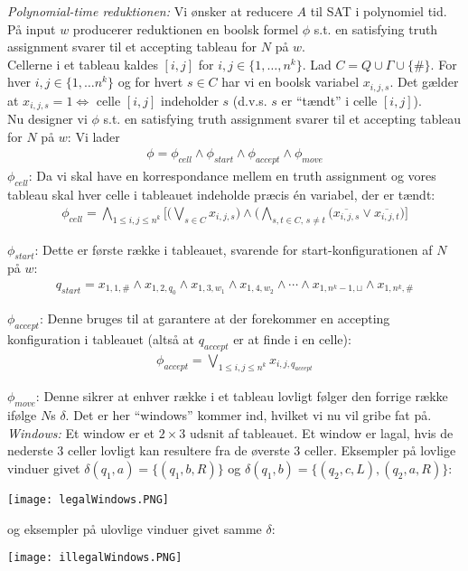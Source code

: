 \textit{Polynomial-time reduktionen:} Vi ønsker at reducere $A$ til SAT i polynomiel tid. På input $w$ producerer reduktionen en boolsk formel $\phi$ s.t. en satisfying truth assignment svarer til et accepting tableau for $N$ på $w$. \\

Cellerne i et tableau kaldes $[i,j]$ for $i,j \in \{1,\ldots,n^k\}$. Lad $C=Q \cup \Gamma \cup \{\#\}$. For hver $i,j \in \{1,\ldots n^k\}$ og for hvert $s \in C$ har vi en boolsk variabel $x_{i,j,s}$. Det gælder at $x_{i,j,s} = 1 \Longleftrightarrow$ celle $[i,j]$ indeholder $s$ (d.v.s. $s$ er ``tændt'' i celle $[i,j]$). \\

Nu designer vi $\phi$ s.t. en satisfying truth assignment svarer til et accepting tableau for $N$ på $w$: Vi lader 
\begin{align*}
	\phi = \phi_{cell} \wedge \phi_{start} \wedge \phi_{accept} \wedge \phi_{move}
\end{align*}  
$\phi_{cell}$: Da vi skal have en korrespondance mellem en truth assignment og vores tableau skal hver celle i tableauet indeholde præcis én variabel, der er tændt: 
\begin{align*}
	\phi_{cell} = \bigwedge_{1 \le i, j \le n^k} \bigg[\bigg(\bigvee_{s \in C} x_{i,j,s} \bigg) \wedge \bigg(\bigwedge_{s,t \in C,\, s\ne t} (\overline{x_{i,j,s}} \vee \overline{x_{i,j,t}} \bigg) \bigg]
\end{align*}

$\phi_{start}$: Dette er første række i tableauet, svarende for start-konfigurationen af $N$ på $w$:
\begin{align*}
	q_{start} = x_{1,1,\#} \wedge x_{1,2,q_0} \wedge x_{1,3,w_1} \wedge x_{1,4,w_2} \wedge \cdots \wedge x_{1,n^k-1,\sqcup} \wedge x_{1,n^k,\#}
\end{align*}

$\phi_{accept}$: Denne bruges til at garantere at der forekommer en accepting konfiguration i tableauet (altså at $q_{accept}$ er at finde i en celle):
\begin{align*}
	\phi_{accept} = \bigvee_{1 \le i, j \le n^k} x_{i,j,q_{accept}} 
\end{align*}

$\phi_{move}$: Denne sikrer at enhver række i et tableau lovligt følger den forrige række ifølge $N$s $\delta$. Det er her ``windows'' kommer ind, hvilket vi nu vil gribe fat på. \\

\textit{Windows:} Et window er et $2 \times 3$ udsnit af tableauet. Et window er lagal, hvis de nederste 3 celler lovligt kan resultere fra de øverste 3 celler. Eksempler på lovlige vinduer givet $\delta(q_1,a)=\{(q_1,b,R)\}$ og $\delta(q_1,b)=\{(q_2,c,L),(q_2,a,R)\}$: 
\begin{center}
	\texttt{[image: legalWindows.PNG]}
\end{center}
og eksempler på ulovlige vinduer givet samme $\delta$:
\begin{center}
	\texttt{[image: illegalWindows.PNG]}
\end{center}

